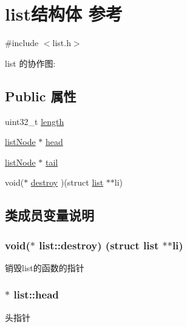 \hypertarget{structlist}{}\section{list结构体 参考}
\label{structlist}


{\ttfamily \#include $<$list.\+h$>$}



list 的协作图\+:
\subsection*{Public 属性}
\begin{DoxyCompactItemize}
\item 
uint32\+\_\+t \hyperlink{structlist_aa550d94029ee5654b79d8f8b6935c0f0}{length}
\item 
\hyperlink{structlistNode}{list\+Node} $\ast$ \hyperlink{structlist_a231e615cc831876b01a16f23ee4bb320}{head}
\item 
\hyperlink{structlistNode}{list\+Node} $\ast$ \hyperlink{structlist_ad53539b1744468c6e2c231061bb9f0b1}{tail}
\item 
void($\ast$ \hyperlink{structlist_a18b2e3227926805b15b91cf13fd807a5}{destroy} )(struct \hyperlink{structlist}{list} $\ast$$\ast$li)
\end{DoxyCompactItemize}


\subsection{类成员变量说明}
\subsubsection[{\texorpdfstring{destroy}{destroy}}]{\setlength{\rightskip}{0pt plus 5cm}void($\ast$ list\+::destroy) (struct {\bf list} $\ast$$\ast$li)}\hypertarget{structlist_a18b2e3227926805b15b91cf13fd807a5}{}\label{structlist_a18b2e3227926805b15b91cf13fd807a5}
销毁list的函数的指针 
\subsubsection[{\texorpdfstring{head}{head}}]{$\ast$ list\+::head}\hypertarget{structlist_a231e615cc831876b01a16f23ee4bb320}{}\label{structlist_a231e615cc831876b01a16f23ee4bb320}
头指针 
